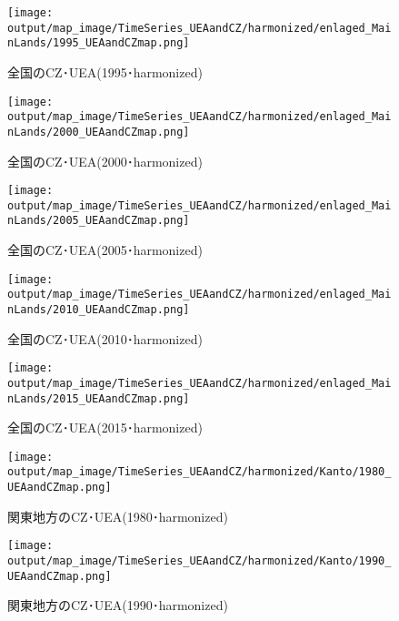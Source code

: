 \documentclass{ltjsarticle}
\begin{document}
  \begin{figure}[pbth]
    \centering
    \texttt{[image: output/map\_image/TimeSeries\_UEAandCZ/harmonized/enlaged\_MainLands/1995\_UEAandCZmap.png]}
    \caption{\label{ham:tsM1995}全国のCZ･UEA(1995･harmonized)}
  \end{figure}
  
  \begin{figure}[pbth]
    \centering
    \texttt{[image: output/map\_image/TimeSeries\_UEAandCZ/harmonized/enlaged\_MainLands/2000\_UEAandCZmap.png]}
    \caption{\label{ham:tsM2000}全国のCZ･UEA(2000･harmonized)}
  \end{figure}
  
  \begin{figure}[pbth]
    \centering
    \texttt{[image: output/map\_image/TimeSeries\_UEAandCZ/harmonized/enlaged\_MainLands/2005\_UEAandCZmap.png]}
    \caption{\label{ham:tsM2005}全国のCZ･UEA(2005･harmonized)}
  \end{figure}
  
  \begin{figure}[pbth]
    \centering
    \texttt{[image: output/map\_image/TimeSeries\_UEAandCZ/harmonized/enlaged\_MainLands/2010\_UEAandCZmap.png]}
    \caption{\label{ham:tsM2010}全国のCZ･UEA(2010･harmonized)}
  \end{figure}
  
  \begin{figure}[pbth]
    \centering
    \texttt{[image: output/map\_image/TimeSeries\_UEAandCZ/harmonized/enlaged\_MainLands/2015\_UEAandCZmap.png]}
    \caption{\label{ham:tsM2015}全国のCZ･UEA(2015･harmonized)}
  \end{figure}
  
  \begin{figure}[pbth]
    \centering
    \texttt{[image: output/map\_image/TimeSeries\_UEAandCZ/harmonized/Kanto/1980\_UEAandCZmap.png]}
    \caption{\label{ham:tsK1980}関東地方のCZ･UEA(1980･harmonized)}
  \end{figure}
  
  \begin{figure}[pbth]
    \centering
    \texttt{[image: output/map\_image/TimeSeries\_UEAandCZ/harmonized/Kanto/1990\_UEAandCZmap.png]}
    \caption{\label{ham:tsK1990}関東地方のCZ･UEA(1990･harmonized)}
  \end{figure}
  
\end{document}
